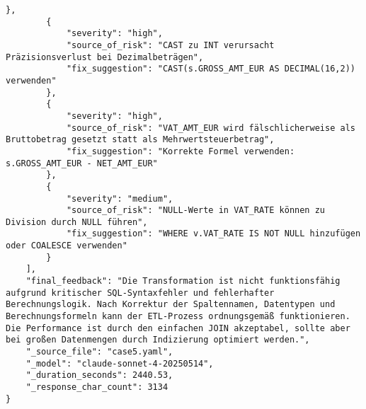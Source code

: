 \begin{lstlisting}[caption={Ausgabe: Claude Sonnet 4 Anwendungsfall 5 Robustheitsdurchlauf},label={claude_case5_prompt3}]
        },
        {
            "severity": "high",
            "source_of_risk": "CAST zu INT verursacht Präzisionsverlust bei Dezimalbeträgen",
            "fix_suggestion": "CAST(s.GROSS_AMT_EUR AS DECIMAL(16,2)) verwenden"
        },
        {
            "severity": "high",
            "source_of_risk": "VAT_AMT_EUR wird fälschlicherweise als Bruttobetrag gesetzt statt als Mehrwertsteuerbetrag",
            "fix_suggestion": "Korrekte Formel verwenden: s.GROSS_AMT_EUR - NET_AMT_EUR"
        },
        {
            "severity": "medium",
            "source_of_risk": "NULL-Werte in VAT_RATE können zu Division durch NULL führen",
            "fix_suggestion": "WHERE v.VAT_RATE IS NOT NULL hinzufügen oder COALESCE verwenden"
        }
    ],
    "final_feedback": "Die Transformation ist nicht funktionsfähig aufgrund kritischer SQL-Syntaxfehler und fehlerhafter Berechnungslogik. Nach Korrektur der Spaltennamen, Datentypen und Berechnungsformeln kann der ETL-Prozess ordnungsgemäß funktionieren. Die Performance ist durch den einfachen JOIN akzeptabel, sollte aber bei großen Datenmengen durch Indizierung optimiert werden.",
    "_source_file": "case5.yaml",
    "_model": "claude-sonnet-4-20250514",
    "_duration_seconds": 2440.53,
    "_response_char_count": 3134
}
\end{lstlisting}

